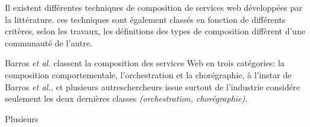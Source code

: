     Il existent différentes techniques de composition de services web
    développées par la littérature. ces techniques sont également
    classés en fonction de différents critères, selon les travaux, les
    définitions des types de composition diffèrent d'une communauté de
    l'autre.

    Barros \emph{et al.} \cite{barros2006standards} classent la
    composition des services Web en trois catégories: la composition
    comportementale, l'orchestration et la chorégraphie, à l'instar de
    Barros \emph{et al.}, \cite{peltz2003web} et plusieurs
    autreschercheurs issue surtout de l'industrie considére seulement
    les deux dernières classes \textit{(orchestration, chorégraphie)}.

  

    Plusieurs





  
    

